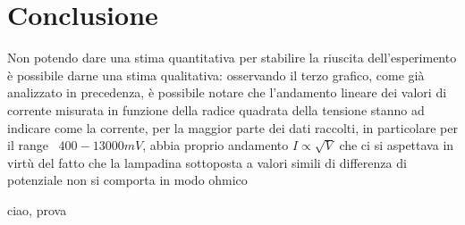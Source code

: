 \documentclass[10pt,twocolumn]{article}
\begin{document}
\section{Conclusione}
Non potendo dare una stima quantitativa per stabilire la riuscita
 dell'esperimento è possibile darne una stima qualitativa: osservando 
 il terzo grafico, come già analizzato in precedenza,
  è possibile notare che l'andamento lineare dei valori di corrente misurata in 
  funzione della radice quadrata della tensione stanno ad indicare come la corrente, 
  per la maggior parte dei dati raccolti, in particolare per il range  $400-13000mV$, 
  abbia proprio andamento $I \propto \sqrt{V}$ che ci si aspettava in virtù del fatto
   che la lampadina sottoposta a valori simili di differenza di potenziale non si comporta in modo ohmico

ciao, prova 
\end{document}
